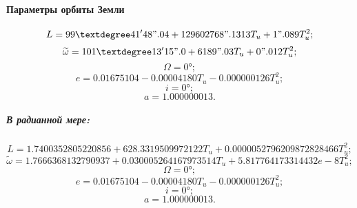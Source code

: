 \paragraph{Параметры орбиты Земли}
$$L = 99°41'48".04 + 129602768".1313 T_u + 1".089 T_u^2;$$
$$\widetilde{\omega} = 101°13'15".0 + 6189".03 T_u + 0".012 T_u^2;$$
$$\Omega = 0°;$$
$$e = 0.01675104 - 0.00004180 T_u - 0.000000126 T_u^2;$$
$$i = 0°;$$
$$a = 1.000000013.$$

\subparagraph{В радианной мере:}
$$L = 1.7400352805220856 + 628.3319509972122 T_u + 0.0000052796209872828466 T_u^2;$$
$$\widetilde{\omega} = 1.7666368132790937 + 0.030005264167973514 T_u + 5.817764173314432e-8 T_u^2;$$
$$\Omega = 0°;$$
$$e = 0.01675104 - 0.00004180 T_u - 0.000000126 T_u^2;$$
$$i = 0°;$$
$$a = 1.000000013.$$